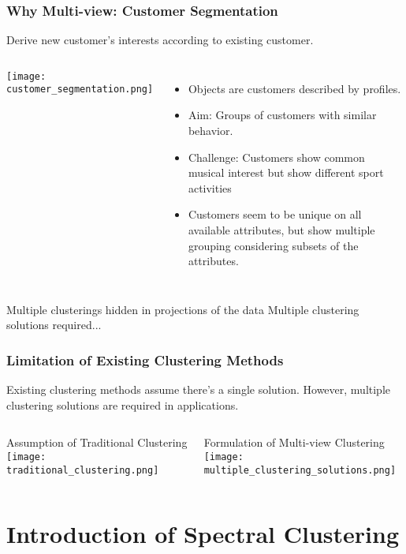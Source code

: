 \documentclass{beamer}
\begin{document}
\begin{frame}
\frametitle{Why Multi-view: Customer Segmentation}
Derive new customer's interests according to existing customer.
	\begin{columns}
		\texttt{[image: customer\_segmentation.png]}
	\begin{itemize}
		\item{Objects are customers described by profiles.}
		\item{Aim: Groups of customers with similar behavior.}
		\item{Challenge: Customers show common musical interest but show different sport activities}
		\item{Customers seem to be unique on all available attributes, but show multiple grouping considering subsets of the attributes.}
	\end{itemize}
	\end{columns}
\begin{block}{Multiple clusterings hidden in projections of the data}
Multiple clustering solutions required...
\end{block}
\end{frame}

\begin{frame}
\frametitle{Limitation of Existing Clustering Methods}
\begin{block}{}
Existing clustering methods assume there's a single solution.
However, multiple clustering solutions are required in applications.
\end{block}
	\begin{columns}
	\column{.5\textwidth}
	\begin{block}{Assumption of Traditional Clustering}
		\texttt{[image: traditional\_clustering.png]}
	\end{block}
	\column{.5\textwidth}
	\begin{block}{Formulation of Multi-view Clustering}
		\texttt{[image: multiple\_clustering\_solutions.png]}
	\end{block}
	\end{columns}
\end{frame}

\section{Introduction of Spectral Clustering}
\end{document}
